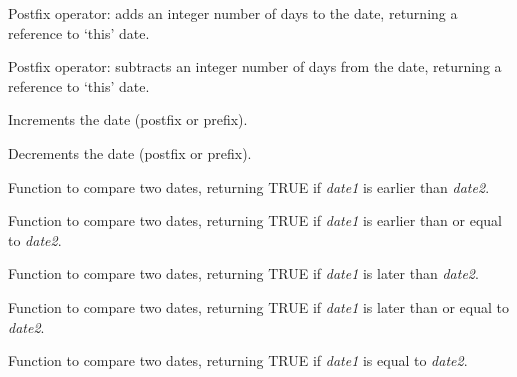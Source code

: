Postfix operator: adds an integer number of days to the date, returning
a reference to `this' date.



Postfix operator: subtracts an integer number of days from the date, returning
a reference to `this' date.



Increments the date (postfix or prefix).



Decrements the date (postfix or prefix).



Function to compare two dates, returning TRUE if {\it date1} is earlier than {\it date2}.



Function to compare two dates, returning TRUE if {\it date1} is earlier than or equal to {\it date2}.



Function to compare two dates, returning TRUE if {\it date1} is later than {\it date2}.



Function to compare two dates, returning TRUE if {\it date1} is later than or equal to {\it date2}.



Function to compare two dates, returning TRUE if {\it date1} is equal to {\it date2}.

